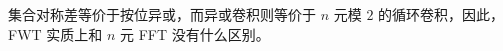 集合对称差等价于按位异或，而异或卷积则等价于 $n$ 元模 $2$ 的循环卷积，因此，FWT 实质上和 $n$ 元 FFT 没有什么区别。
\inputminted{cpp}{src/poly/xor.cpp}